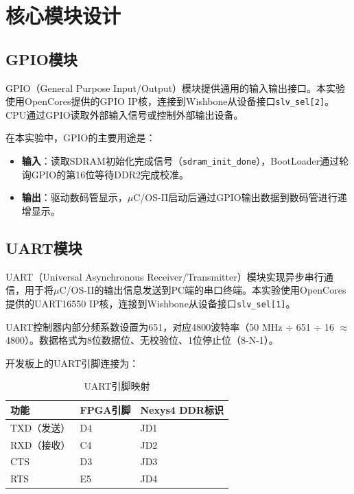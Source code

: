 \section{核心模块设计}

\subsection{GPIO模块}

GPIO（General Purpose Input/Output）模块提供通用的输入输出接口。本实验使用OpenCores提供的GPIO IP核，连接到Wishbone从设备接口\texttt{slv\_sel[2]}。CPU通过GPIO读取外部输入信号或控制外部输出设备。

在本实验中，GPIO的主要用途是：
\begin{itemize}[leftmargin=2em]
    \item \textbf{输入}：读取SDRAM初始化完成信号（\texttt{sdram\_init\_done}），BootLoader通过轮询GPIO的第16位等待DDR2完成校准。
    \item \textbf{输出}：驱动数码管显示，$\mu$C/OS-II启动后通过GPIO输出数据到数码管进行递增显示。
\end{itemize}

\subsection{UART模块}

UART（Universal Asynchronous Receiver/Transmitter）模块实现异步串行通信，用于将$\mu$C/OS-II的输出信息发送到PC端的串口终端。本实验使用OpenCores提供的UART16550 IP核，连接到Wishbone从设备接口\texttt{slv\_sel[1]}。

UART控制器内部分频系数设置为651，对应4800波特率（50 MHz $\div$ 651 $\div$ 16 $\approx$ 4800）。数据格式为8位数据位、无校验位、1位停止位（8-N-1）。

开发板上的UART引脚连接为：
\begin{table}[H]
    \centering
    \caption{UART引脚映射}
    \begin{tabular}{lll}
        \toprule
        \textbf{功能} & \textbf{FPGA引脚} & \textbf{Nexys4 DDR标识} \\
        \midrule
        TXD（发送） & D4 & JD1 \\
        RXD（接收） & C4 & JD2 \\
        CTS & D3 & JD3 \\
        RTS & E5 & JD4 \\
        \bottomrule
    \end{tabular}
\end{table}

